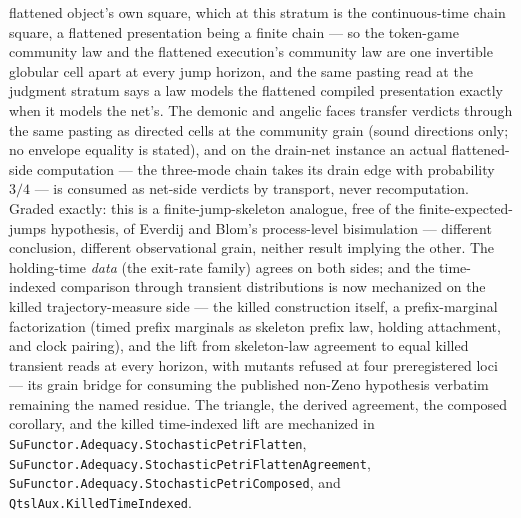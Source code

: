 flattened object's own square, which at this stratum is the
continuous-time chain square, a flattened presentation being a finite
chain --- so the token-game community law and the flattened
execution's community law are one invertible globular cell apart at
every jump horizon, and the same pasting read at the judgment stratum
says a law models the flattened compiled presentation exactly when it
models the net's.  The demonic and angelic faces transfer verdicts
through the same pasting as directed cells at the community grain
(sound directions only; no envelope equality is stated), and on the
drain-net instance an actual flattened-side computation --- the
three-mode chain takes its drain edge with probability $3/4$ --- is
consumed as net-side verdicts by transport, never recomputation.
Graded exactly: this is a finite-jump-skeleton analogue, free of the
finite-expected-jumps hypothesis, of Everdij and Blom's process-level
bisimulation --- different conclusion, different observational grain,
neither result implying the other.  The holding-time \emph{data} (the
exit-rate family) agrees on both sides; and the time-indexed
comparison through transient distributions is now mechanized on the
killed trajectory-measure side --- the killed construction itself, a
prefix-marginal factorization (timed prefix marginals as skeleton
prefix law, holding attachment, and clock pairing), and the lift
from skeleton-law agreement to equal killed transient reads at every
horizon, with mutants refused at four preregistered loci --- its
grain bridge for consuming the published non-Zeno hypothesis
verbatim remaining the named residue.  The triangle, the derived
agreement, the composed corollary, and the killed time-indexed lift
are mechanized in
\texttt{SuFunctor.Adequacy.StochasticPetriFlatten},
\texttt{SuFunctor.Adequacy.StochasticPetriFlattenAgreement},
\texttt{SuFunctor.Adequacy.StochasticPetriComposed}, and
\texttt{QtslAux.KilledTimeIndexed}.

